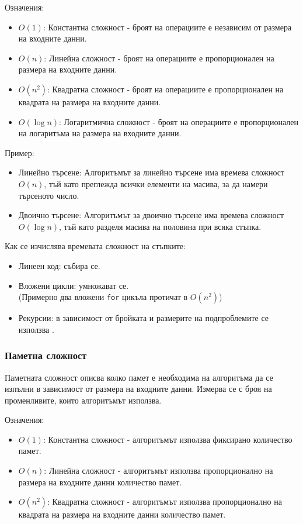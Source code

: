 \documentclass[oneside]{book}
\newcommand*{\code}[1]{\texttt{#1}}
\begin{document}
Означения:
\begin{itemize}
    \item[] $O(1)$: Константна сложност - броят на операциите е независим от размера на входните данни.
    \item[] $O(n)$: Линейна сложност - броят на операциите е пропорционален на размера на входните данни.
    \item[] $O(n^2)$: Квадратна сложност - броят на операциите е пропорционален на квадрата на размера на входните данни.
    \item[] $O(\log n)$: Логаритмична сложност - броят на операциите е пропорционален на логаритъма на размера на входните данни.
\end{itemize}
\pagebreak
Пример:
\begin{itemize}
    \item[] Линейно търсене: Алгоритъмът за линейно търсене има времева сложност $O(n)$, тъй като преглежда всички елементи на масива, за да намери търсеното число.
    \item[] Двоично търсене: Алгоритъмът за двоично търсене има времева сложност $O(\log n)$, тъй като разделя масива на половина при всяка стъпка.
\end{itemize}

Как се изчислява времевата сложност на стъпките:
\begin{itemize}
    \item[] Линеен код: събира се.
    \item[] Вложени цикли: умножават се.\\(Примерно два вложени \code{for} цикъла протичат в $O(n^2)$)
    \item[] Рекурсии: в зависимост от бройката и размерите на подпроблемите се използва .
\end{itemize}

\subsubsection{Паметна сложност}
Паметната сложност описва колко памет е необходима на алгоритъма да се изпълни в зависимост от размера на входните данни. Измерва се с броя на променливите, които алгоритъмът използва.

Означения:
\begin{itemize}
    \item[] $O(1)$: Константна сложност - алгоритъмът използва фиксирано количество памет.
    \item[] $O(n)$: Линейна сложност - алгоритъмът използва пропорционално на размера на входните данни количество памет.
    \item[] $O(n^2)$: Квадратна сложност - алгоритъмът използва пропорционално на квадрата на размера на входните данни количество памет.
\end{itemize}
\end{document}
